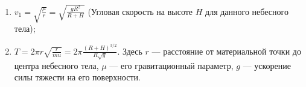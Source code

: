 \begin{enumerate}
	\item $v_1 = \sqrt{\frac{\mu}{r}} =
	\sqrt{\frac{gR^2}{R + H}}$
	(Угловая скорость на высоте $H$ для данного небесного тела);
	\item $T = 2\pi r\sqrt{\frac{r}{mu}} =
	2\pi\frac{(R+H)^{ 3/2 }}{R\sqrt{g}}$.
	Здесь $r$ --- расстояние от материальной точки до центра небесного тела,
	$\mu$ --- его гравитационный параметр,
	$g$ ---	ускорение силы тяжести на его поверхности.
\end{enumerate}
